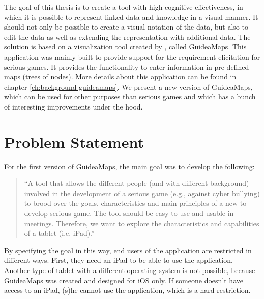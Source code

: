 The goal of this thesis is to create a tool with high cognitive effectiveness, in which it is possible to represent linked data and knowledge in a visual manner. It should not only be possible to create a visual notation of the data, but also to edit the data as well as extending the representation with additional data. The solution is based on a visualization tool created by \cite{erikjanssens}, called GuideaMaps. This application was mainly built to provide support for the requirement elicitation for serious games. It provides the functionality to enter information in pre-defined maps (trees of nodes). More details about this application can be found in chapter \ref{ch:background-guideamaps}. We present a new version of GuideaMaps, which can be used for other purposes than serious games and which has a bunch of interesting improvements under the hood.





\section{Problem Statement}\label{sec:problem-statement}
For the first version of GuideaMaps, the main goal was to develop the following:

\begin{quote}
``A tool that allows the different people (and with different background) involved in the development of a serious game (e.g., against cyber bullying) to brood over the goals, characteristics and main principles of a new to develop serious game. The tool should be easy to use and usable in meetings. Therefore, we want to explore the characteristics and capabilities of a tablet (i.e. iPad).'' \hfill \citep{erikjanssens}
\end{quote}

By specifying the goal in this way, end users of the application are restricted in different ways. First, they need an iPad to be able to use the application. Another type of tablet with a different operating system is not possible, because GuideaMaps was created and designed for iOS only. If someone doesn't have access to an iPad, (s)he cannot use the application, which is a hard restriction.\\

